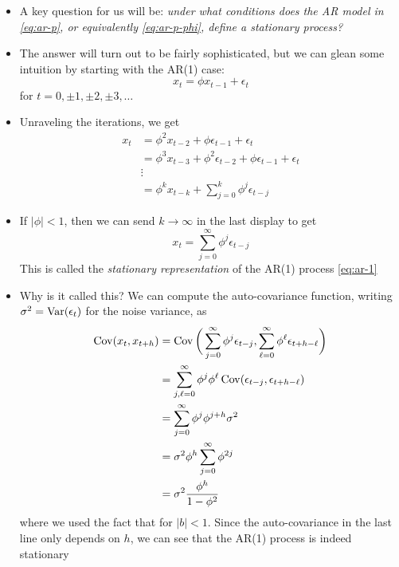 \documentclass{article}
\begin{document}
\begin{itemize}
\item A key question for us will be: \emph{under what conditions does the AR
    model  in \eqref{eq:ar-p}, or equivalently \eqref{eq:ar-p-phi}, define a
    stationary process?} 

\item The answer will turn out to be fairly sophisticated, but we can glean some
  intuition by starting with the AR(1) case: 
  \begin{equation}
  \label{eq:ar-1}
  x_t = \phi x_{t-1} + \epsilon_t 
  \end{equation}
  for  $t = 0, \pm 1, \pm 2, \pm 3, \dots$ 

\item Unraveling the iterations, we get
  \begin{align*}
  x_t &= \phi^2 x_{t-2} + \phi \epsilon_{t-1} + \epsilon_t \\
  &= \phi^3 x_{t-3} + \phi^2 \epsilon_{t-2} + \phi \epsilon_{t-1} + \epsilon_t
    \\  
  &\vdots \\ 
  &= \phi^k x_{t-k} + \sum_{j=0}^k \phi^j \epsilon_{t-j} 
  \end{align*}

\item If $|\phi| < 1$, then we can send $k \to \infty$ in the last display to 
  get 
  \begin{equation}
  \label{eq:ar-1-stationary}
  x_t = \sum_{j=0}^\infty \phi^j \epsilon_{t-j} 
  \end{equation}
  This is called the \emph{stationary representation} of the AR(1) process
  \eqref{eq:ar-1} 

\item Why is it called this? We can compute the auto-covariance function,
  writing $\sigma^2 = \operatorname{Var}(\epsilon_t)$ for the noise variance, as
  \begin{align}
  \nonumber
  \operatorname{Cov}(x_t, x_{t+h}) &= \operatorname{Cov}\bigg( \sum_{j=0}^\infty \phi^j \epsilon_{t-j}, 
  \sum_{\ell=0}^\infty \phi^\ell \epsilon_{t+h-\ell} \bigg) \\
  \nonumber
  &= \sum_{j,\ell=0}^\infty \phi^j \phi^\ell \operatorname{Cov}( \epsilon_{t-j},
    \epsilon_{t+h-\ell} ) \\
  \nonumber
  &= \sum_{j=0}^\infty \phi^j \phi^{j+h} \sigma^2 \\
  \nonumber
  &= \sigma^2 \phi^h \sum_{j=0}^\infty \phi^{2j} \\
  \label{eq:ar-1-auto-cov}
  &= \sigma^2 \frac{\phi^h}{1 - \phi^2}    
  \end{align}
  where we used the fact that  for $|b|
  < 1$. Since the auto-covariance in the last line only depends on $h$, we can
  see that the AR(1) process is indeed stationary


\end{itemize}
\end{document}
